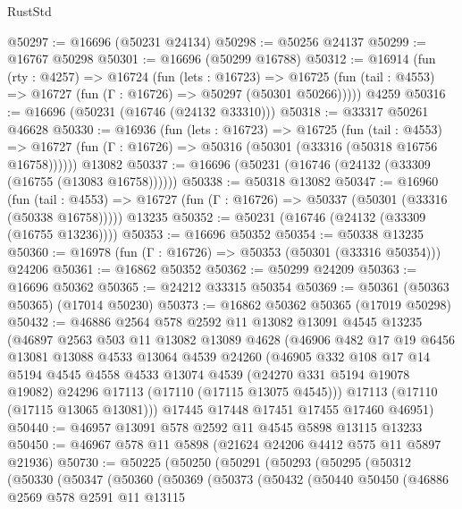 \begin{lexlean}{RustStd}
\begin{coremodule}
@50297 := @16696 (@50231 @24134)
@50298 := @50256 @24137
@50299 := @16767 @50298
@50301 := @16696 (@50299 @16788)
@50312 := @16914
    (fun (rty : @4257) =>
    @16724
      (fun (lets : @16723) =>
      @16725 (fun (tail : @4553) => @16727 (fun (Γ : @16726) => @50297 (@50301 @50266)))))
    @4259
@50316 := @16696 (@50231 (@16746 (@24132 @33310)))
@50318 := @33317 @50261 @46628
@50330 := @16936
    (fun (lets : @16723) =>
    @16725
      (fun (tail : @4553) =>
      @16727 (fun (Γ : @16726) => @50316 (@50301 (@33316 (@50318 @16756 @16758))))))
    @13082
@50337 := @16696 (@50231 (@16746 (@24132 (@33309 (@16755 (@13083 @16758))))))
@50338 := @50318 @13082
@50347 := @16960
    (fun (tail : @4553) => @16727 (fun (Γ : @16726) => @50337 (@50301 (@33316 (@50338 @16758)))))
    @13235
@50352 := @50231 (@16746 (@24132 (@33309 (@16755 @13236))))
@50353 := @16696 @50352
@50354 := @50338 @13235
@50360 := @16978 (fun (Γ : @16726) => @50353 (@50301 (@33316 @50354))) @24206
@50361 := @16862 @50352
@50362 := @50299 @24209
@50363 := @16696 @50362
@50365 := @24212 @33315 @50354
@50369 := @50361 (@50363 @50365) (@17014 @50230)
@50373 := @16862 @50362 @50365 (@17019 @50298)
@50432 := @46886
    @2564
    @578
    @2592
    @11
    @13082
    @13091
    @4545
    @13235
    (@46897
      @2563
      @503
      @11
      @13082
      @13089
      @4628
      (@46906
        @482
        @17
        @19
        @6456
        @13081
        @13088
        @4533
        @13064
        @4539
        @24260
        (@46905
          @332
          @108
          @17
          @14
          @5194
          @4545
          @4558
          @4533
          @13074
          @4539
          (@24270 @331 @5194 @19078 @19082)
          @24296
          @17113
          (@17110 (@17115 @13075 @4545)))
        @17113
        (@17110 (@17115 @13065 @13081)))
      @17445
      @17448
      @17451
      @17455
      @17460
      @46951)
@50440 := @46957 @13091 @578 @2592 @11 @4545 @5898 @13115 @13233
@50450 := @46967 @578 @11 @5898 (@21624 @24206 @4412 @575 @11 @5897 @21936)
@50730 := @50225
    (@50250
      (@50291
        (@50293
          (@50295
            (@50312
              (@50330
                (@50347
                  (@50360
                    (@50369
                      (@50373
                        (@50432
                          (@50440
                            @50450
                            (@46886
                              @2569
                              @578
                              @2591
                              @11
                              @13115

\end{coremodule}
\end{lexlean}
